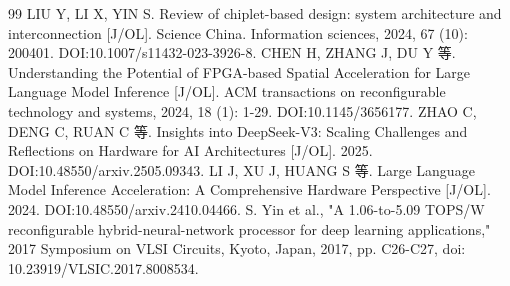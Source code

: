\documentclass[12pt,a4paper]{article}%
\begin{document}
\begin{thebibliography}{99}
         LIU Y, LI X, YIN S. Review of chiplet-based design: system architecture and interconnection [J/OL]. Science China. Information sciences, 2024, 67 (10): 200401. DOI:10.1007/s11432-023-3926-8.
         CHEN H, ZHANG J, DU Y 等. Understanding the Potential of FPGA-based Spatial Acceleration for Large Language Model Inference [J/OL]. ACM transactions on reconfigurable technology and systems, 2024, 18 (1): 1-29. DOI:10.1145/3656177.
         ZHAO C, DENG C, RUAN C 等. Insights into DeepSeek-V3: Scaling Challenges and Reflections on Hardware for AI Architectures [J/OL]. 2025. DOI:10.48550/arxiv.2505.09343.
         LI J, XU J, HUANG S 等. Large Language Model Inference Acceleration: A Comprehensive Hardware Perspective [J/OL]. 2024. DOI:10.48550/arxiv.2410.04466.
         S. Yin et al., "A 1.06-to-5.09 TOPS/W reconfigurable hybrid-neural-network processor for deep learning applications," 2017 Symposium on VLSI Circuits, Kyoto, Japan, 2017, pp. C26-C27, doi: 10.23919/VLSIC.2017.8008534. 
    \end{thebibliography}
	
	
	
\end{document}
